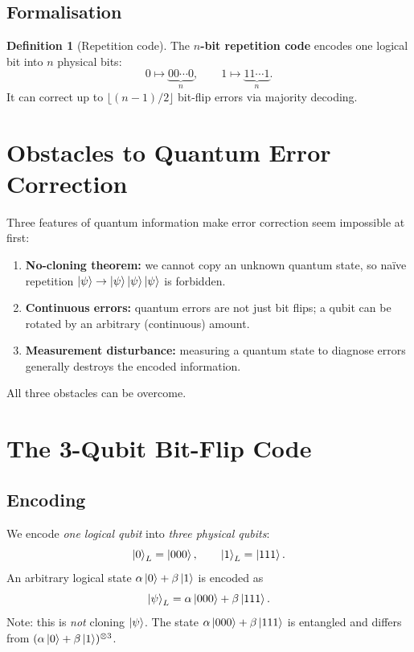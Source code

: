 \documentclass[11pt]{article}
\theoremstyle{definition}
\newtheorem{definition}{Definition}[section]
\begin{document}
\subsection{Formalisation}

\begin{definition}[Repetition code]
The \textbf{$n$-bit repetition code} encodes one logical bit into $n$ physical bits:
\[
    0\mapsto \underbrace{00\cdots 0}_{n},\qquad 1\mapsto \underbrace{11\cdots 1}_{n}.
\]
It can correct up to $\lfloor(n-1)/2\rfloor$ bit-flip errors via majority decoding.
\end{definition}

\section{Obstacles to Quantum Error Correction}

Three features of quantum information make error correction seem impossible at first:
\begin{enumerate}
    \item \textbf{No-cloning theorem:} we cannot copy an unknown quantum state, so na\"ive repetition $\ket{\psi}\to\ket{\psi}\ket{\psi}\ket{\psi}$ is forbidden.
    \item \textbf{Continuous errors:} quantum errors are not just bit flips; a qubit can be rotated by an arbitrary (continuous) amount.
    \item \textbf{Measurement disturbance:} measuring a quantum state to diagnose errors generally destroys the encoded information.
\end{enumerate}

All three obstacles can be overcome.

\section{The 3-Qubit Bit-Flip Code}

\subsection{Encoding}

We encode \emph{one logical qubit} into \emph{three physical qubits}:
\[
    \ket{0}_L = \ket{000}, \qquad \ket{1}_L = \ket{111}.
\]
An arbitrary logical state $\alpha\ket{0}+\beta\ket{1}$ is encoded as
\[
    \ket{\psi}_L = \alpha\ket{000}+\beta\ket{111}.
\]
Note: this is \emph{not} cloning $\ket{\psi}$.  The state $\alpha\ket{000}+\beta\ket{111}$ is entangled and differs from $(\alpha\ket{0}+\beta\ket{1})^{\otimes 3}$.
\end{document}
